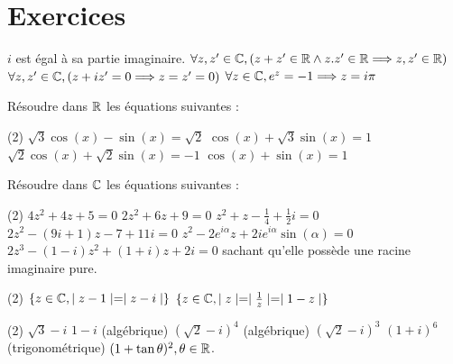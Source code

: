 \section{Exercices}



\begin{exercise}[subtitle= Assertions justes ou fausses ?, difficulty=*]
		\begin{tasks} 
			\task $i$ est égal à sa partie imaginaire. 
			\task $\forall z,z' \in \mathbb{C}, ( z+z' \in \mathbb{R} \wedge z.z' \in \mathbb{R} \Longrightarrow z,z' \in \mathbb{R})$
			\task $\forall z,z' \in \mathbb{C}, (z+iz' = 0 \Longrightarrow z = z' = 0)$
			\task $\forall z \in \mathbb{C}, e^z = -1 \Longrightarrow z = i\pi$
		\end{tasks}
\end{exercise}


\begin{exercise}[subtitle= Résolution d'équations dans $\RR$, difficulty=*]
	Résoudre dans $\RR$ les équations suivantes : 
	\begin{tasks}(2) 
		\task $\sqrt{3} \cos(x) - \sin(x) = \sqrt{2}$
	    \task $\cos(x) + \sqrt{3}\sin(x) = 1$
	    \task $\sqrt{2}\cos(x) + \sqrt{2}\sin(x) = -1$
	    \task $\cos(x) + \sin(x) = 1$
	\end{tasks}
\end{exercise}

\begin{exercise}[subtitle= Résolution d'équations dans $\CC$, difficulty=***]
	Résoudre dans $\CC$ les équations suivantes : 
	\begin{tasks}(2) 
		\task $4z^2 + 4z + 5 = 0$
		\task $2z^2 + 6z + 9= 0$
		\task $z^2 + z - \frac{1}{4} +\frac{1}{2}i = 0$
		\task $2z^2-(9i+1)z-7+11i=0$
		\task $z^2 - 2 e^{i\alpha} z + 2ie^{i\alpha}\sin(\alpha) = 0$
		\task $2z^3 -(1-i)z^2 + (1+i)z+2i=0$ sachant qu'elle possède une racine imaginaire pure. 
	\end{tasks}
\end{exercise}


\begin{exercise}[subtitle= Déterminer les ensembles, difficulty=**]
	\begin{tasks}(2) 
		\task $\{z \in \mathbb{C}, \mid z-1 \mid = \mid z - i\mid\}$
		\task $\{z \in \mathbb{C}, \mid z \mid = \mid \frac{1}{z}\mid = \mid 1 -z \mid\}$
	\end{tasks}
\end{exercise}


\begin{exercise}[subtitle=Transformer le nombre complexe sous une autre forme, difficulty=*]
	\begin{tasks}(2)
		\task $\sqrt{3} - i$ 
		\task $1 - i$
		\task (algébrique) $(\sqrt{2} - i)^4$
		\task (algébrique) $(\sqrt{2} - i)^3$
		\task $(1+i)^6$
		\task (trigonométrique)	$ (1 + \tan{\theta})^2, \theta \in \mathbb{R}$.  
	\end{tasks}
\end{exercise}



